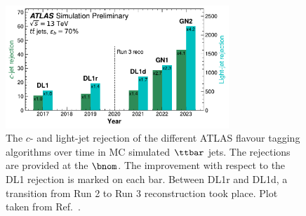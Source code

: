 \begin{figure}
    \centering
    \includegraphics[width=0.75\textwidth]{figures/flavour_tagging/year_improvement.pdf}
    \caption{The $c$- and light-jet rejection of the different ATLAS flavour tagging algorithms over time in MC simulated $\ttbar$ jets. The rejections are provided at the $\bnom$. The improvement with respect to the DL1 rejection is marked on each bar. Between DL1r and DL1d, a transition from Run 2 to Run 3 reconstruction took place. Plot taken from Ref.~\cite{GN2Plots}.}
    \label{fig:ftag_better}
\end{figure}


